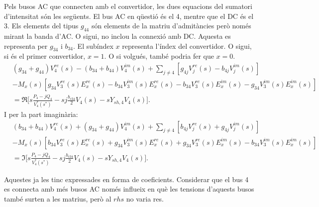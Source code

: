 \documentclass[11pt]{article}
\begin{document}
Pels busos AC que connecten amb el convertidor, les dues equacions del sumatori d'intensitat són les següents. El bus AC en qüestió és el 4, mentre que el DC és el 3. Els elements del tipus $g_{44}$ són elements de la matriu d'admitàncies però només mirant la banda d'AC. O sigui, no inclou la connexió amb DC. Aquesta es representa per $g_{34}$ i $b_{34}$. El subíndex $x$ representa l'índex del convertidor. O sigui, si és el primer convertidor, $x=1$. O si volgués, també podria fer que $x=0$. 
\begin{equation}
    \begin{split}
    &(g_{34}+g_{44})V^{re}_4(s) - (b_{34}+b_{44})V^{im}_4(s)
    + \sum_{j\neq 4}[g_{4j}V^{re}_j(s) - b_{4j}V^{im}_j(s)] \\
    &- M_x(s)[g_{34}V^{re}_3(s)E^{re}_x(s)-b_{34}V^{im}_3(s)E^{re}_x(s)
    -b_{34}V^{re}_3(s)E^{im}_x(s)-g_{34}V^{im}_3(s)E^{im}_x(s)] \\
    &= \Re\biggl[s\frac{P_4-jQ_4}{V^*_4(s^*)} - sj\frac{b_{c34}}{2}V_4(s) - sY_{sh,4}V_4(s)\biggr].
    \end{split}
\end{equation}
I per la part imaginària:
\begin{equation}
    \begin{split}
    &(b_{34}+b_{44})V^{re}_4(s) + (g_{34}+g_{44})V^{im}_4(s)
    + \sum_{j\neq 4}[b_{4j}V^{re}_j(s) + g_{4j}V^{im}_j(s)] \\
    &- M_x(s)[b_{34}V^{re}_3(s)E^{re}_x(s)+g_{34}V^{im}_3(s)E^{re}_x(s)
    +g_{34}V^{re}_3(s)E^{im}_x(s)-b_{34}V^{im}_3(s)E^{im}_x(s)] \\
    &= \Im\biggl[s\frac{P_4-jQ_4}{V^*_4(s^*)} - sj\frac{b_{c34}}{2}V_4(s) - sY_{sh,4}V_4(s)\biggr].
    \end{split}
\end{equation}

Aquestes ja les tinc expressades en forma de coeficients. Considerar que el bus 4 es connecta amb més busos AC només influeix en què les tensions d'aquests busos també surten a les matrius, però al $rhs$ no varia res. 
\end{document}
